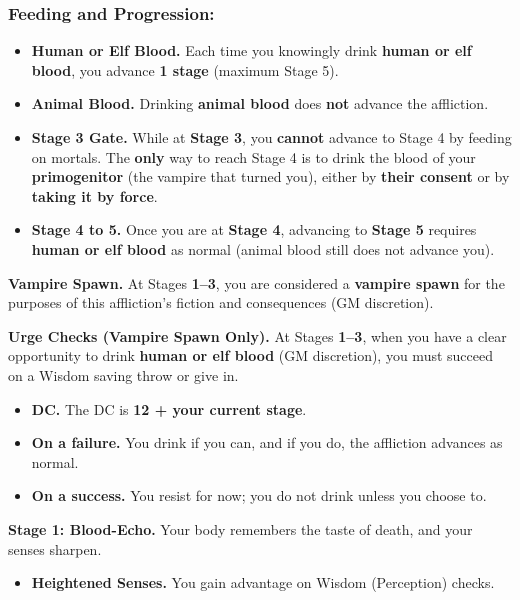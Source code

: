 \subsubsection{Feeding and Progression:}
\begin{itemize}
\item \textbf{Human or Elf Blood.} Each time you knowingly drink \textbf{human or elf blood}, you advance \textbf{1 stage} (maximum Stage 5).
\item \textbf{Animal Blood.} Drinking \textbf{animal blood} does \textbf{not} advance the affliction.
\item \textbf{Stage 3 Gate.} While at \textbf{Stage 3}, you \textbf{cannot} advance to Stage 4 by feeding on mortals. The \textbf{only} way to reach Stage 4 is to drink the blood of your \textbf{primogenitor} (the vampire that turned you), either by \textbf{their consent} or by \textbf{taking it by force}.
\item \textbf{Stage 4 to 5.} Once you are at \textbf{Stage 4}, advancing to \textbf{Stage 5} requires \textbf{human or elf blood} as normal (animal blood still does not advance you).
\end{itemize}

\textbf{Vampire Spawn.} At Stages \textbf{1--3}, you are considered a \textbf{vampire spawn} for the purposes of this affliction's fiction and consequences (GM discretion).

\textbf{Urge Checks (Vampire Spawn Only).} At Stages \textbf{1--3}, when you have a clear opportunity to drink \textbf{human or elf blood} (GM discretion), you must succeed on a Wisdom saving throw or give in.
\begin{itemize}
\item \textbf{DC.} The DC is \textbf{12 + your current stage}.
\item \textbf{On a failure.} You drink if you can, and if you do, the affliction advances as normal.
\item \textbf{On a success.} You resist for now; you do not drink unless you choose to.
\end{itemize}

\medskip

\textbf{Stage 1: Blood-Echo.}
Your body remembers the taste of death, and your senses sharpen.
\begin{itemize}
\item \textbf{Heightened Senses.} You gain advantage on Wisdom (Perception) checks.
\end{itemize}

